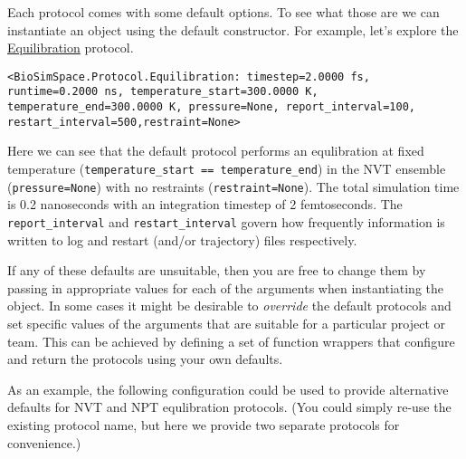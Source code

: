 Each protocol comes with some default options. To see what those are we
can instantiate an object using the default constructor. For example,
let's explore the
\href{https://biosimspace.org/api/generated/BioSimSpace.Protocol.Equilibration.html\#BioSimSpace.Protocol.Equilibration}{Equilibration}
protocol.

\begin{Shaded}
\begin{Highlighting}[]
\OperatorTok{=}
\end{Highlighting}
\end{Shaded}

\begin{verbatim}
<BioSimSpace.Protocol.Equilibration: timestep=2.0000 fs, runtime=0.2000 ns, temperature_start=300.0000 K, temperature_end=300.0000 K, pressure=None, report_interval=100, restart_interval=500,restraint=None>
\end{verbatim}

Here we can see that the default protocol performs an equlibration at
fixed temperature (\texttt{temperature\_start\ ==\ temperature\_end}) in
the NVT ensemble (\texttt{pressure=None}) with no restraints
(\texttt{restraint=None}). The total simulation time is 0.2 nanoseconds
with an integration timestep of 2 femtoseconds. The
\texttt{report\_interval} and \texttt{restart\_interval} govern how
frequently information is written to log and restart (and/or trajectory)
files respectively.

If any of these defaults are unsuitable, then you are free to change
them by passing in appropriate values for each of the arguments when
instantiating the object. In some cases it might be desirable to
\emph{override} the default protocols and set specific values of the
arguments that are suitable for a particular project or team. This can
be achieved by defining a set of function wrappers that configure and
return the protocols using your own defaults.

As an example, the following configuration could be used to provide
alternative defaults for NVT and NPT equlibration protocols. (You could
simply re-use the existing protocol name, but here we provide two
separate protocols for convenience.)

